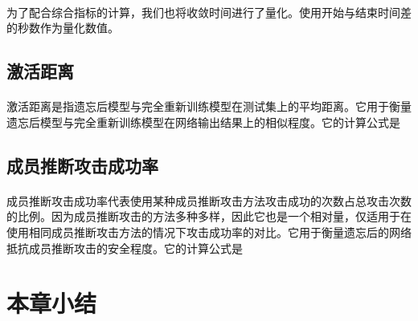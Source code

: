 \paragraph{}为了配合综合指标的计算，我们也将收敛时间进行了量化。使用开始与结束时间差的秒数作为量化数值。
\subsection{激活距离}
\paragraph{}激活距离是指遗忘后模型与完全重新训练模型在测试集上的平均距离。它用于衡量遗忘后模型与完全重新训练模型在网络输出结果上的相似程度。它的计算公式是
\subsection{成员推断攻击成功率}
\paragraph{}成员推断攻击成功率代表使用某种成员推断攻击方法攻击成功的次数占总攻击次数的比例。因为成员推断攻击的方法多种多样，因此它也是一个相对量，仅适用于在使用相同成员推断攻击方法的情况下攻击成功率的对比。它用于衡量遗忘后的网络抵抗成员推断攻击的安全程度。它的计算公式是
\section{本章小结}

